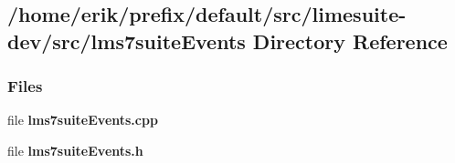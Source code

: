 \subsection{/home/erik/prefix/default/src/limesuite-\/dev/src/lms7suite\+Events Directory Reference}
\label{dir_af567da5c3d326d0840c05c6e8c01f89}
\subsubsection*{Files}
\begin{DoxyCompactItemize}
\item 
file {\bf lms7suite\+Events.\+cpp}
\item 
file {\bf lms7suite\+Events.\+h}
\end{DoxyCompactItemize}
